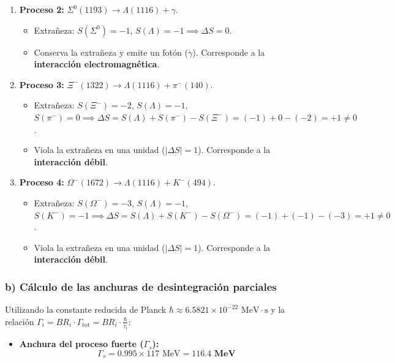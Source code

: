 \begin{problema}
\begin{enumerate}[label=\arabic*.]
    \item \textbf{Proceso 2:} $\Sigma^0(1193) \to \Lambda(1116) + \gamma$.
    \begin{itemize}
        \item Extrañeza: $S(\Sigma^0) = -1$, $S(\Lambda) = -1 \implies \Delta S = 0$.
        \item Conserva la extrañeza y emite un fotón ($\gamma$). Corresponde a la \textbf{interacción electromagnética}.
    \end{itemize}

    \item \textbf{Proceso 3:} $\Xi^-(1322) \to \Lambda(1116) + \pi^-(140)$.
    \begin{itemize}
        \item Extrañeza: $S(\Xi^-) = -2$, $S(\Lambda) = -1$, $S(\pi^-) = 0 \implies \Delta S = S(\Lambda) + S(\pi^-) - S(\Xi^-) = (-1) + 0 - (-2) = +1 \neq 0$.
        \item Viola la extrañeza en una unidad ($|\Delta S| = 1$). Corresponde a la \textbf{interacción débil}.
    \end{itemize}

    \item \textbf{Proceso 4:} $\Omega^-(1672) \to \Lambda(1116) + K^-(494)$.
    \begin{itemize}
        \item Extrañeza: $S(\Omega^-) = -3$, $S(\Lambda) = -1$, $S(K^-) = -1 \implies \Delta S = S(\Lambda) + S(K^-) - S(\Omega^-) = (-1) + (-1) - (-3) = +1 \neq 0$.
        \item Viola la extrañeza en una unidad ($|\Delta S| = 1$). Corresponde a la \textbf{interacción débil}.
    \end{itemize}
\end{enumerate}

\subsubsection*{b) Cálculo de las anchuras de desintegración parciales}

Utilizando la constante reducida de Planck $\hbar \approx 6.5821 \times 10^{-22} \text{ MeV}\cdot\text{s}$ y la relación $\Gamma_i = BR_i \cdot \Gamma_{\text{tot}} = BR_i \cdot \frac{\hbar}{\tau_i}$:

\begin{itemize}
    \item \textbf{Anchura del proceso fuerte ($\Gamma_s$):}
    \begin{equation*}
        \Gamma_s = 0.995 \times 117 \text{ MeV} = \mathbf{116.4 \text{ MeV}}
    \end{equation*}


\end{itemize}
\end{problema}
